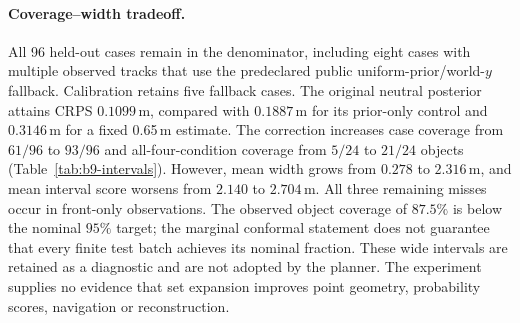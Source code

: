 \paragraph{Coverage--width tradeoff.}
All 96 held-out cases remain in the denominator, including eight cases with multiple observed tracks that use the predeclared public uniform-prior/world-$y$ fallback. Calibration retains five fallback cases. The original neutral posterior attains CRPS $0.1099$\,m, compared with $0.1887$\,m for its prior-only control and $0.3146$\,m for a fixed 0.65\,m estimate. The correction increases case coverage from $61/96$ to $93/96$ and all-four-condition coverage from $5/24$ to $21/24$ objects (Table~\ref{tab:b9-intervals}). However, mean width grows from $0.278$ to $2.316$\,m, and mean interval score worsens from $2.140$ to $2.704$\,m. All three remaining misses occur in front-only observations. The observed object coverage of $87.5\%$ is below the nominal $95\%$ target; the marginal conformal statement does not guarantee that every finite test batch achieves its nominal fraction. These wide intervals are retained as a diagnostic and are not adopted by the planner. The experiment supplies no evidence that set expansion improves point geometry, probability scores, navigation or reconstruction.



